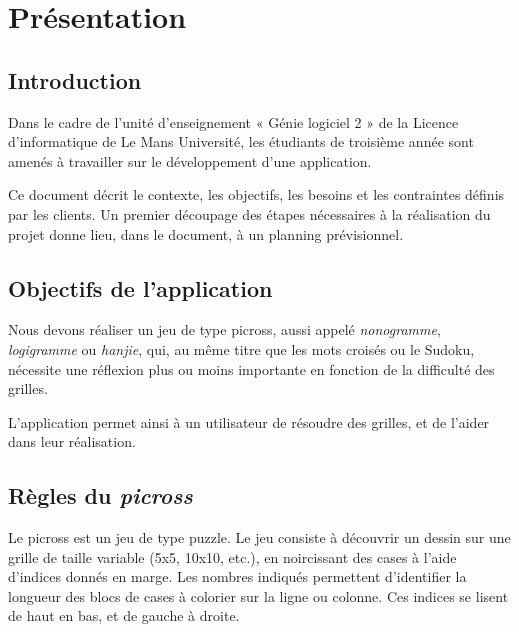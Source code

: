 \documentclass[a4paper, 12pt]{report}
\begin{document}
\renewcommand{\contentsname}{Sommaire}
\tableofcontents
\thispagestyle{empty}
\thispagestyle{plain}



\chapter{Présentation}
\thispagestyle{empty}
\thispagestyle{plain}
\vspace*{0.5cm}
	\section{Introduction}
	\vspace*{0.2cm}

		Dans le cadre de l'unité d'enseignement « Génie logiciel 2 » de la Licence d'informatique de Le Mans Université, les étudiants de troisième année sont amenés à travailler sur le développement d'une application.
		
		Ce document décrit le contexte, les objectifs, les besoins et les contraintes définis par les clients. Un premier découpage des étapes nécessaires à la réalisation du projet donne lieu, dans le document, à un planning prévisionnel.	\vspace*{0.2cm}


 	\section{Objectifs de l'application}
 	\vspace*{0.2cm}
 	
		Nous devons réaliser un jeu de type picross, aussi appelé \textit{nonogramme}, \textit{logigramme} ou \textit{hanjie}, qui, au même titre que les mots croisés ou le Sudoku, nécessite une réflexion plus ou moins importante en fonction de la difficulté des grilles.
		
		L'application permet ainsi à un utilisateur de résoudre des grilles, et de l'aider dans leur réalisation.
	\vspace*{0.2cm}

	\section{Règles du \textit{picross}}
	\vspace*{0.2cm}
	
		Le picross est un jeu de type puzzle. Le jeu consiste à découvrir un dessin sur une grille de taille variable (5x5, 10x10, etc.), en noircissant des cases à l'aide d'indices donnés en marge.
		Les nombres indiqués permettent d'identifier la longueur des blocs de cases à colorier sur la ligne ou colonne. Ces indices se lisent de haut en bas, et de gauche à droite.
		
\end{document}
